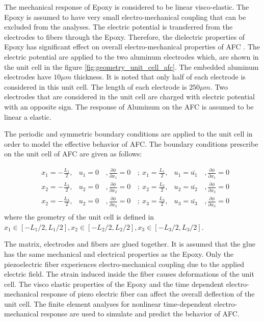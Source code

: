The mechanical response of Epoxy is considered to be linear visco-elastic.
The Epoxy is assumed to have very small electro-mechanical coupling that can be excluded from the analyses.
The electric potential is transferred from the electrodes to fibers through the Epoxy.
Therefore, the dielectric properties of Epoxy has significant effect on overall electro-mechanical properties of AFC \cite{atitallah2014parametric}. 
The electric potential are applied to the two aluminum electrodes which, are shown in the unit cell in the figure \ref{fig:geometry_unit_cell_afc}.
The embedded aluminum electrodes have $10 \mu m$ thickness.
It is noted that only half of each electrode is considered in this unit cell.
The length of each electrode is $250 \mu m$.
Two electrodes that are considered in the unit cell are charged with electric potential with an opposite sign.
The response of Aluminum on the AFC is assumed to be linear a elastic.

The periodic and symmetric boundary conditions are applied to the unit cell in order to model the effective behavior of AFC. 
The boundary conditions prescribe on the unit cell of AFC are given as follows:

\begin{equation}
\begin{aligned} 
& x_1=-\frac{L_1}{2}  ,& u_1=0 &\, , \frac{\partial \phi}{\partial x_1}=0        &\, ; \ x_1= \frac{L_1}{2}  ,& u_1=\bar{u_1} &\, ,  \frac{\partial \phi}{\partial x_1}=0   \\ 
& x_2=-\frac{L_2}{2}  ,& u_2=0 &\, , \frac{\partial \phi}{\partial x_2}=0        &\, ; \ x_2= \frac{L_2}{2}  ,& u_2=\bar{u_2} &\, ,  \frac{\partial \phi}{\partial x_2}=0   \\ 
& x_2=-\frac{L_3}{2}  ,& u_2=0 &\, , \frac{\partial \phi}{\partial x_3}=0        &\, ; \ x_3= \frac{L_3}{2}  ,& u_3=\bar{u_3} &\, , \frac{\partial \phi}{\partial x_3}=0    \\
\end{aligned}
\end{equation}
where the geometry of the unit cell is defined in $x_1 \in [-L_1/2,L_1/2], x_2 \in [-L_2/2,L_2/2], x_3 \in [-L_3/2,L_3/2]$.


The matrix, electrodes and fibers are glued together.
It is assumed that the glue has the same mechanical and electrical properties as the Epoxy.
Only the piezoelectric fiber experiences electro-mechanical coupling due to the applied electric field.
The strain induced inside the fiber causes deformations of the unit cell.
The visco elastic properties of the Epoxy and the time
 dependent electro-mechanical response of piezo electric fiber can affect the overall deflection of the unit cell.
The finite element analyses for nonlinear time-dependent electro-mechanical response are used to simulate and predict the behavior of AFC. 

